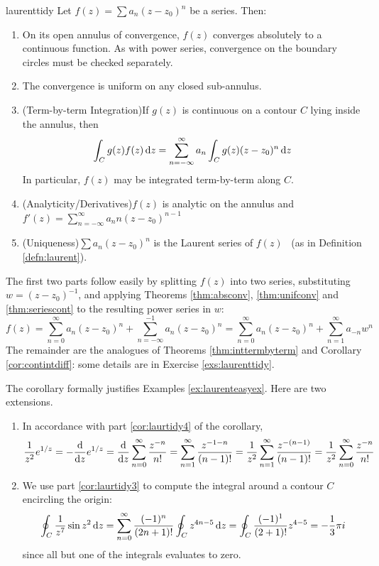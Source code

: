 \begin{cor}{}{laurenttidy}
	Let $f(z)=\sum a_n(z-z_0)^n$ be a series. Then:
	\begin{enumerate}
	  \item On its open annulus of convergence, $f(z)$ converges absolutely to a continuous function. As with power series, convergence on the boundary circles must be checked separately.
	  \item The convergence is uniform on any closed sub-annulus.
  	\item\label{cor:laurtidy3} (Term-by-term Integration)\quad If $g(z)$ is continuous on a contour $C$ lying inside the annulus, then
  	\[
  		\int_C g(z)f(z)\,{\mathrm{d} z}=\sum_{n=-\infty}^\infty a_n\int_Cg(z)(z-z_0)^n\,{\mathrm{d} z}
  	\]
  	In particular, $f(z)$ may be integrated term-by-term along $C$.
 
 		\item\label{cor:laurtidy4} (Analyticity/Derivatives)\quad $f(z)$ is analytic on the annulus and $f'(z)=\sum\limits_{n=-\infty}^\infty a_nn(z-z_0)^{n-1}$
  	
  	\item\label{cor:laurtidy5} (Uniqueness)\quad $\sum a_n(z-z_0)^n$ is the Laurent series of $f(z)$ \ (as in Definition \ref{defn:laurent}).
	\end{enumerate}
\end{cor}

The first two parts follow easily by splitting $f(z)$ into two series, substituting $w=(z-z_0)^{-1}$, and applying Theorems \ref{thm:absconv}, \ref{thm:unifconv} and \ref{thm:seriescont} to the resulting power series in $w$:
\[
	f(z)=\sum\limits_{n=0}^{\infty} a_n(z-z_0)^n+\sum\limits_{n=-\infty}^{-1} a_n(z-z_0)^n
	=\sum\limits_{n=0}^{\infty} a_n(z-z_0)^n +\sum\limits_{n=1}^\infty a_{-n}w^n
\]
 The remainder are the analogues of Theorems \ref{thm:inttermbyterm} and Corollary \ref{cor:contintdiff}: some details are in Exercise \ref{exs:laurenttidy}.


\begin{examples}{}{}
	The corollary formally justifies Examples \ref{ex:laurenteasyex}. Here are two extensions.
	\begin{enumerate}
	  \item In accordance with part \ref*{cor:laurtidy4} of the corollary,
		\[
			\frac 1{z^2}e^{1/z}=
			-\frac{\mathrm{d} }{\mathrm{d} z}e^{1/z}=\frac{\mathrm{d} }{\mathrm{d} z}\sum_{n=0}^\infty\frac{z^{-n}}{n!} 
			=\sum_{n=1}^\infty\frac{z^{-1-n}}{(n-1)!} 
			=\frac 1{z^2}\sum_{n=1}^\infty\frac{z^{-(n-1)}}{(n-1)!} 
			=\frac 1{z^2}\sum_{n=0}^\infty\frac{z^{-n}}{n!}
		\]
		\item We use part \ref*{cor:laurtidy3} to compute the integral around a contour $C$ encircling the origin:
		\[
			\oint_C\frac 1{z^7}\sin z^2\,{\mathrm{d} z} =\sum_{n=0}^\infty\frac{(-1)^n}{(2n+1)!}\oint_Cz^{4n-5}\,{\mathrm{d} z} =\oint_C\frac{(-1)^1}{(2+1)!}z^{4-5} =-\frac 13\pi i
		\]
		since all but one of the integrals evaluates to zero.
	\end{enumerate}
\end{examples}

